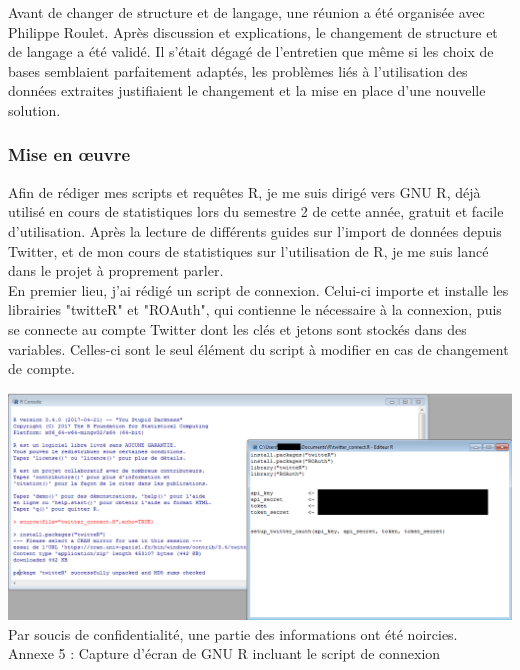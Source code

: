 \documentclass[a4paper,12pt]{article}
\begin{document}
Avant de changer de structure et de langage, une réunion a été organisée avec Philippe Roulet. Après discussion et explications, le changement de structure et de langage a été validé. Il s'était dégagé de l'entretien que même si les choix de bases semblaient parfaitement adaptés, les problèmes liés à l'utilisation des données extraites justifiaient le changement et la mise en place d'une nouvelle solution.


\subsubsection{Mise en œuvre}
Afin de rédiger mes scripts et requêtes R, je me suis dirigé vers GNU R, déjà utilisé en cours de statistiques lors du semestre 2 de cette année, gratuit et facile d'utilisation. Après la lecture de différents guides sur l'import de données depuis Twitter, et de mon cours de statistiques sur l'utilisation de R, je me suis lancé dans le projet à proprement parler. \\

En premier lieu, j'ai rédigé un script de connexion. Celui-ci importe et installe les librairies "twitteR" et "ROAuth", qui contienne le nécessaire à la connexion, puis se connecte au compte Twitter dont les clés et jetons sont stockés dans des variables. Celles-ci sont le seul élément du script à modifier en cas de changement de compte. \\

\begin{center}
    \hspace*{-0.23\textwidth}
    \includegraphics[scale=0.6]{illustrations/r-script-screen}
    Par soucis de confidentialité, une partie des informations ont été noircies. \\
    
    Annexe 5 : Capture d'écran de GNU R incluant le script de connexion
\end{center}
\end{document}
